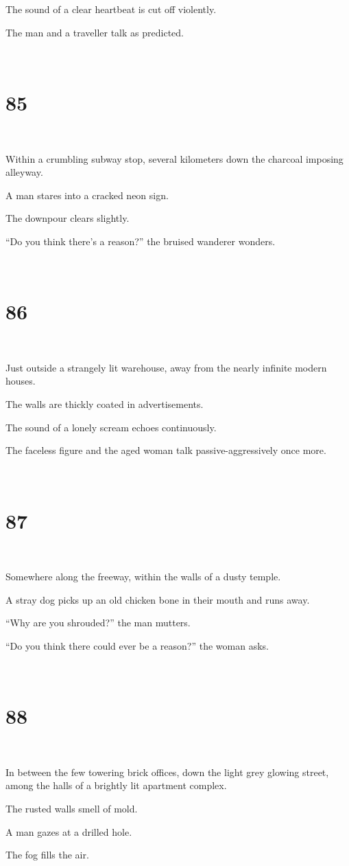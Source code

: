 \documentclass{report}
\begin{document}
The sound of a clear heartbeat is cut off violently.

The man and a traveller talk as predicted.

~
\chapter*{85}
~

Within a crumbling subway stop, several kilometers down the charcoal imposing alleyway.

A man stares into a cracked neon sign.

The downpour clears slightly.

``Do you think there's a reason?'' the bruised wanderer wonders.

~
\chapter*{86}
~

Just outside a strangely lit warehouse, away from the nearly infinite modern houses.

The walls are thickly coated in advertisements.

The sound of a lonely scream echoes continuously.

The faceless figure and the aged woman talk passive-aggressively once more.

~
\chapter*{87}
~

Somewhere along the freeway, within the walls of a dusty temple.

A stray dog picks up an old chicken bone in their mouth and runs away.

``Why are you shrouded?'' the man mutters.

``Do you think there could ever be a reason?'' the woman asks.

~
\chapter*{88}
~

In between the few towering brick offices, down the light grey glowing street, among the halls of a brightly lit apartment complex.

The rusted walls smell of mold.

A man gazes at a drilled hole.

The fog fills the air.
\end{document}
